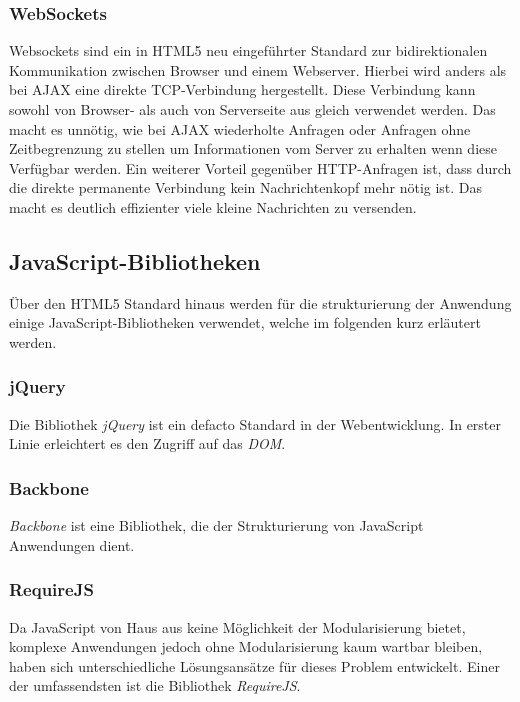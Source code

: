 \subsubsection{WebSockets}

Websockets sind ein in HTML5 neu eingeführter Standard zur bidirektionalen  Kommunikation zwischen
Browser und einem Webserver. Hierbei wird anders als bei  AJAX eine direkte TCP-Verbindung
hergestellt. Diese Verbindung kann sowohl von  Browser- als auch von Serverseite aus gleich
verwendet werden. Das macht es  unnötig, wie bei AJAX wiederholte Anfragen oder Anfragen ohne
Zeitbegrenzung zu  stellen um Informationen vom Server zu erhalten wenn diese Verfügbar werden. Ein
weiterer Vorteil gegenüber HTTP-Anfragen ist, dass durch die direkte permanente Verbindung kein
Nachrichtenkopf mehr nötig ist. Das macht es deutlich  effizienter viele kleine Nachrichten zu
versenden.

\subsection{JavaScript-Bibliotheken}

Über den HTML5 Standard hinaus werden für die strukturierung der Anwendung einige 
JavaScript-Bibliotheken verwendet, welche im folgenden kurz erläutert werden.

\subsubsection{jQuery}

Die Bibliothek \textit{jQuery} ist ein defacto Standard in der Webentwicklung.  In erster Linie
erleichtert es den Zugriff auf das \textit{DOM}. 

\subsubsection{Backbone}

\textit{Backbone} ist eine Bibliothek, die der Strukturierung von JavaScript Anwendungen dient.

\subsubsection{RequireJS}

Da JavaScript von Haus aus keine Möglichkeit der Modularisierung bietet,  komplexe Anwendungen
jedoch ohne Modularisierung kaum wartbar bleiben, haben  sich unterschiedliche Lösungsansätze für
dieses Problem entwickelt. Einer der  umfassendsten ist die Bibliothek \textit{RequireJS}.

